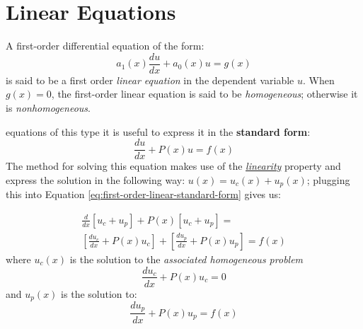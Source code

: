 \section{Linear Equations}
A first-order differential equation of the form:
\begin{equation}
a_1(x)\frac{du}{dx} + a_0(x)u = g(x)
\label{eq:lin_first_order}
\end{equation}
is said to be a first order \emph{linear equation} in the dependent variable $u$.
When $g(x) = 0$, the first-order linear equation is said to be \emph{homogeneous}; otherwise it is \emph{nonhomogeneous}.

 equations of this type it is useful to express it in the \textbf{standard form}:
\begin{equation}
\frac{du}{dx}+P(x)u = f(x)
\label{eq:first-order-linear-standard-form}
\end{equation}  
The method for solving this equation makes use of the \underline{\emph{linearity}} property and express the solution in the following way: $u(x) = u_c(x) + u_p(x)$; plugging this into Equation \ref{eq:first-order-linear-standard-form} gives us:

\begin{multline*}
\frac{d}{dx}[u_c + u_p] + P(x)[u_c + u_p] = \\
\left[\frac{du_c}{dx}+P(x)u_c \right] + \left[\frac{du_p}{dx}+P(x)u_p \right] = f(x) 
\end{multline*}
where $u_c(x)$ is the solution to the \emph{associated homogeneous problem} 
\begin{equation}
\frac{du_c}{dx}+P(x)u_c = 0
\label{eq:fol_complementary}
\end{equation}
and $u_p(x)$ is the solution to:
\begin{equation}
\frac{du_p}{dx}+P(x)u_p = f(x)
\label{eq:fol_particular}
\end{equation}

